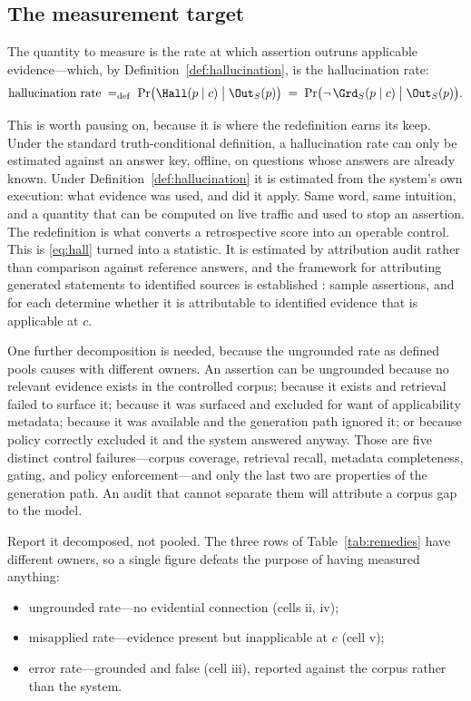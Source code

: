 \subsection{The measurement target}

The quantity to measure is the rate at which assertion outruns applicable
evidence---which, by Definition~\ref{def:hallucination}, is the hallucination rate:
\begin{equation}
  \text{hallucination rate}
  \;=_{\mathrm{def}}\;
  \Pr\bigl(\Hall(p \mid c) \;\big|\; \Out_S(p)\bigr)
  \;=\;
  \Pr\bigl(\neg\,\Grd_S(p \mid c) \;\big|\; \Out_S(p)\bigr).
  \label{eq:rate}
\end{equation}

This is worth pausing on, because it is where the redefinition earns its keep. Under
the standard truth-conditional definition, a hallucination rate can only be
estimated against an answer key, offline, on questions whose answers are already
known. Under Definition~\ref{def:hallucination} it is estimated from the system's own
execution: what evidence was used, and did it apply. Same word, same intuition, and a
quantity that can be computed on live traffic and used to stop an assertion. The
redefinition is what converts a retrospective score into an operable control.
This is \eqref{eq:hall} turned into a statistic. It is estimated by attribution
audit rather than comparison against reference answers, and the framework for attributing
generated statements to identified sources is established
\citep{rashkin2023}: sample assertions, and for each determine whether it is
attributable to identified evidence that is applicable at $c$.

One further decomposition is needed, because the ungrounded rate as defined pools
causes with different owners. An assertion can be ungrounded because no relevant
evidence exists in the controlled corpus; because it exists and retrieval failed to
surface it; because it was surfaced and excluded for want of applicability metadata;
because it was available and the generation path ignored it; or because policy
correctly excluded it and the system answered anyway. Those are five distinct control
failures---corpus coverage, retrieval recall, metadata completeness, gating, and policy
enforcement---and only the last two are properties of the generation path. An audit
that cannot separate them will attribute a corpus gap to the model.

Report it decomposed, not pooled. The three rows of
Table~\ref{tab:remedies} have different owners, so a single figure defeats the
purpose of having measured anything:
\begin{itemize}
  \item ungrounded rate---no evidential connection (cells ii, iv);
  \item misapplied rate---evidence present but inapplicable at $c$ (cell v);
  \item error rate---grounded and false (cell iii), reported against the corpus
        rather than the system.
\end{itemize}

